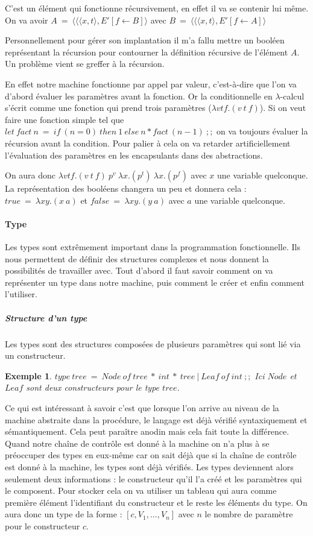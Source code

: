 \documentclass[10pt,a4paper]{report}
\newtheorem{ex}{Exemple}
\begin{document}
	C'est un élément qui fonctionne récursivement, en effet il va se contenir lui même. 
	\\
	On va avoir $A~=~\langle \langle \langle x,t\rangle,E'[f \leftarrow B]\rangle$ avec $B~=~\langle \langle \langle x,t\rangle,E'[f \leftarrow A]\rangle$
	\medbreak
	
	Personnellement pour gérer son implantation il m'a fallu mettre un booléen représentant la récursion pour contourner la définition récursive de l'élément $A$. Un problème vient se greffer à la récursion. 
	\medbreak
	
	En effet notre machine fonctionne par appel par valeur, c'est-à-dire que l'on va d'abord évaluer les paramètres avant la fonction. Or la conditionnelle en $\lambda$-calcul s'écrit comme une fonction qui prend trois paramètres ($\lambda vtf.(v~t~f)$). Si on veut faire une fonction simple tel que $let~fact~n~=~if~(n=0)~then~1~else~n*fact~(n-1)~;;$ on va toujours évaluer la récursion avant la condition. Pour palier à cela on va retarder artificiellement l'évaluation des paramètres en les encapsulants dans des abstractions. 
	\medbreak
	
	On aura donc $\lambda vtf.(v~t~f)~p^{v}~\lambda x.(p^{t})~\lambda x.(p^{f})$ avec $x$ une variable quelconque. La représentation des booléens changera un peu et donnera cela : $true~=~\lambda xy.(x~a)$ et $false~=~\lambda xy.(y~a)$ avec $a$ une variable quelconque.
	\bigbreak
	
	
	\paragraph{Type } Les types sont extrêmement important dans la programmation fonctionnelle. Ils nous permettent de définir des structures complexes et nous donnent la possibilités de travailler avec. Tout d'abord il faut savoir comment on va représenter un type dans notre machine, puis comment le créer et enfin comment l'utiliser.
	
		\subparagraph{Structure d'un type} Les types sont des structures composées de plusieurs paramètres qui sont lié via un constructeur.
		
		\begin{ex}
			$type~tree~=~Node~of~tree~*~int~*~tree~|~Leaf~of~int~;;$
			\smallbreak
			Ici $Node$ et $Leaf$ sont deux constructeurs pour le type $tree$.
		\end{ex}
	
	Ce qui est intéressant à savoir c'est que lorsque l'on arrive au niveau de la machine abstraite dans la procédure, le langage est déjà vérifié syntaxiquement et sémantiquement. Cela peut paraître anodin mais cela fait toute la différence. Quand notre chaîne de contrôle est donné à la machine on n'a plus à se préoccuper des types en eux-même car on sait déjà que si la chaîne de contrôle est donné à la machine, les types sont déjà vérifiés. Les types deviennent alors seulement deux informations : le constructeur qu'il l'a créé et les paramètres qui le composent. Pour stocker cela on va utiliser un tableau qui aura comme première élément l'identifiant du constructeur et le reste les éléments du type. On aura donc un type de la forme : $[c,V_{1},...,V_{n}]$ avec $n$ le nombre de paramètre pour le constructeur $c$.
		
\end{document}
